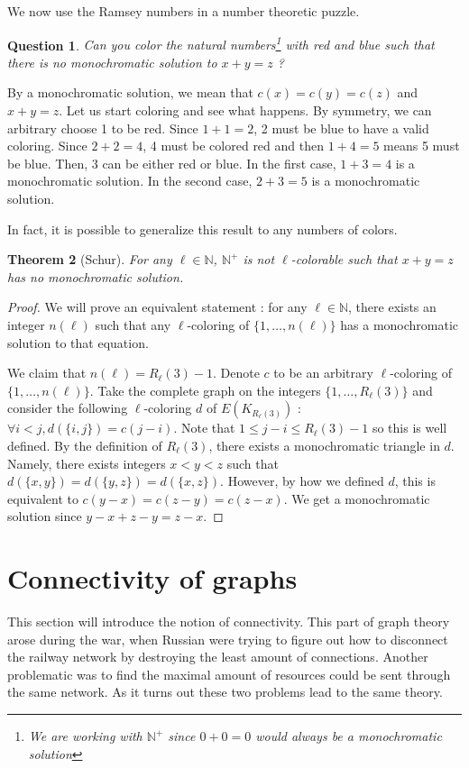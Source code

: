 \documentclass{tufte-handout}
\newtheorem{thm}{Theorem}
\newtheorem{quest}[thm]{Question}
\theoremstyle{definition}
\theoremstyle{remark}
\newcommand{\N}{\mathbb{N}}
\begin{document}
We now use the Ramsey numbers in a number theoretic puzzle.
\begin{quest}
	Can you color the natural numbers\footnote{We are working with $\N^+$ since $0+0=0$ would always be a monochromatic solution} with red and blue such that there is no monochromatic solution to $x+y=z$ ?
\end{quest}
By a monochromatic solution, we mean that $c(x)=c(y)=c(z)$ and $x+y = z$. Let us start coloring and see what happens. By symmetry, we can arbitrary choose 1 to be red. Since $1+1=2$, 2 must be blue to have a valid coloring. Since $2+2=4$, 4 must be colored red and then $1+4=5$ means 5 must be blue. Then, 3 can be either red or blue. In the first case, $1+3=4$ is a monochromatic solution. In the second case, $2+3 = 5$ is a monochromatic solution.

In fact, it is possible to generalize this result to any numbers of colors.
\begin{thm}[Schur]
	For any $\ell \in \N$, $\N^+$ is not $\ell$-colorable such that $x+y=z$ has no monochromatic solution.
\end{thm}
\begin{proof}
	We will prove an equivalent statement : for any $\ell \in \N$, there exists an integer $n(\ell)$ such that any $\ell$-coloring of $\{1,\dots, n(\ell)\}$ has a monochromatic solution to that equation.
	
	We claim that $n(\ell) = R_{\ell}(3) -1$. Denote $c$ to be an arbitrary $\ell$-coloring of $\{1,\dots, n(\ell)\}$. Take the complete graph on the integers $\{1,\dots, R_{\ell}(3)\}$ and consider the following $\ell$-coloring $d$ of $E(K_{R_{\ell}(3)})$ : $\forall i< j, d(\{i,j\}) = c(j-i)$. Note that $1 \leq j-i \leq R_{\ell}(3)-1$ so this is well defined. By the definition of $R_{\ell}(3)$, there exists a monochromatic triangle in $d$. Namely, there exists integers $x<y<z$ such that $d(\{x,y\}) = d(\{y,z\}) = d(\{x,z\})$. However, by how we defined $d$, this is equivalent to $c(y-x) = c(z-y) = c(z-x)$. We get a monochromatic solution since $y-x + z-y = z-x$.
\end{proof}

\section{Connectivity of graphs}
This section will introduce the notion of connectivity. This part of graph theory arose during the war, when Russian were trying to figure out how to disconnect the railway network by destroying the least amount of connections. Another problematic was to find the maximal amount of resources could be sent through the same network. As it turns out these two problems lead to the same theory.
\end{document}
